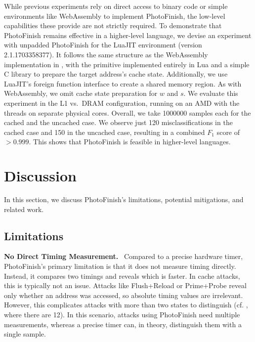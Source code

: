 \documentclass[letterpaper,twocolumn,10pt]{article} %
\newcommand{\paragrabf}[1]{\noindent \textbf{#1.}\ }
\newcommand{\AttackName}{PhotoFinish\xspace}
\begin{document}
While previous experiments rely on direct access to binary code or simple environments like WebAssembly to implement \AttackName, the low-level capabilities these provide are not strictly required.
To demonstrate that \AttackName remains effective in a higher-level language, we devise an experiment with unpadded \AttackName for the LuaJIT environment (version 2.1.1703358377).
It follows the same structure as the WebAssembly implementation in , with the primitive implemented entirely in Lua and a simple C library to prepare the target address's cache state.
Additionally, we use LuaJIT's foreign function interface to create a shared memory region.
As with WebAssembly, we omit cache state preparation for $w$ and $s$.
We evaluate this experiment in the L1 vs.\ DRAM configuration, running on an AMD \labthirtyCPU with the threads on separate physical cores.
Overall, we take \num{1000000} samples each for the cached and the uncached case.
We observe just \num{120} misclassifications in the cached case and \num{150} in the uncached case, resulting in a combined $F_1$ score of $> 0.999$.
This shows that \AttackName is feasible in higher-level languages.



\section{Discussion}\label{sec:discussion}
In this section, we discuss \AttackName's limitations, potential mitigations, and related work.

\subsection{Limitations}\label{subsec:limitations}

\paragrabf{No Direct Timing Measurement}
Compared to a precise hardware timer, \AttackName's primary limitation is that it does not measure timing directly.
Instead, it compares two timings and reveals which is faster.
In cache attacks, this is typically not an issue.
Attacks like Flush+Reload or Prime+Probe reveal only whether an address was accessed, so absolute timing values are irrelevant.
However, this complicates attacks with more than two states to distinguish (cf. , where there are 12).
In this scenario, attacks using \AttackName need multiple measurements, whereas a precise timer can, in theory, distinguish them with a single sample.
\end{document}
